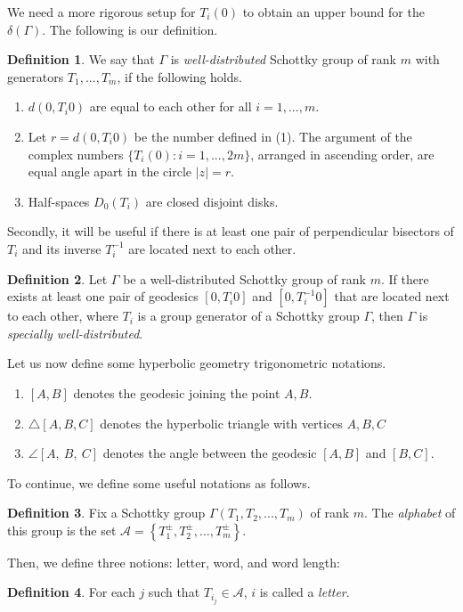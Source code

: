 \documentclass[12pt,oneside]{sfsuthesis}
\theoremstyle{plain} %
\theoremstyle{definition}  %
\newtheorem{definition}{Definition}[chapter]
\theoremstyle{remark}  %
\theoremstyle{plain}
\begin{document}
{We need a more rigorous setup for $T_i(0)$ to obtain an upper bound for the $\delta(\Gamma)$. The following is our definition.

\begin{definition} {\rm We say that $\Gamma$ is {\it well-distributed} Schottky group of rank $m$  with generators $T_1,...,T_m$, if the following holds.}
\begin{enumerate}
\item[(1)] {\rm $d(0,T_i0)$ are equal to each other for all $i=1,...,m$. }
\item[(2)] {\rm  Let $r = d(0,T_i0)$ be the number defined in (1). The argument of the complex numbers $\{T_i (0): i=1,...,2m\}$, arranged in ascending order, are equal angle apart in the circle  $|z|=r$}. 
\item[(3)] {\rm Half-spaces $D_0(T_i)$ are closed disjoint disks. }

\end{enumerate}
\end{definition}

Secondly, it will be useful if there is at least one pair of perpendicular bisectors of $T_i$ and its inverse $T^{-1}_i$ are located next to each other. 

\begin{definition}\label{def special}
Let $\Gamma$ be a well-distributed Schottky group of rank $m$. If there exists at least one pair of geodesics $[0,T_i0]$ and $[0,T^{-1}_i0]$ that are located next to each other, where $T_i$ is a group generator of a Schottky group $\Gamma$, then $\Gamma$ is \textit{specially well-distributed}. 
\end{definition}




Let us now define some hyperbolic geometry trigonometric notations. 
\begin{enumerate}
\item $[A,B]$ denotes  the geodesic joining the point $A,B$. 
\item $\bigtriangleup [A, B, C]$ denotes the hyperbolic  triangle with vertices $A,B,C$ 
\item $\angle   [A, \ B, \ C]$ denotes the angle between the geodesic $[A,B]$ and $[B,C]$. 
\end{enumerate}

To continue, we define some useful notations as follows.

\begin{definition}
Fix a Schottky group $\Gamma(T_1,T_2,...,T_m)$ of rank $m$. The \textit{alphabet} of this group is the set $\mathcal{A}=\left\lbrace T_1^{\pm},T_2^{\pm},...,T_m^{\pm}\right\rbrace$.
\end{definition}
Then, we define three notions: letter, word, and word length:
\begin{definition}
For each $j$ such that $T_{i_j}\in \mathcal{A}$, $i$ is called a \textit{letter}.


\end{definition}}
\end{document}
